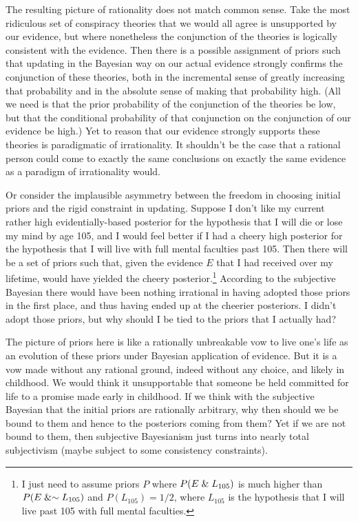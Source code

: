 The resulting picture of rationality does not match common sense. Take the most
ridiculous set of conspiracy theories that we would all agree is unsupported by our evidence, 
but where nonetheless the conjunction of the theories is logically consistent with the evidence.
Then there is a possible assignment of priors such that updating in the Bayesian way on our actual 
evidence strongly confirms the conjunction of these theories, both in the incremental sense of 
greatly increasing that probability and in the absolute sense of making that probability high. (All 
we need is that the prior probability of the conjunction of the theories be low, but that the conditional
probability of that conjunction on the conjunction of our evidence be high.) Yet to reason that
our evidence strongly supports these theories is paradigmatic of irrationality. It shouldn't be the
case that a rational person could come to exactly the same conclusions on exactly the same evidence
as a paradigm of irrationality would.

Or consider the implausible asymmetry between the freedom in choosing initial priors and the
rigid constraint in updating. Suppose I don't like my current rather high evidentially-based posterior for 
the hypothesis that I will die or lose my mind by age 105, and I would feel better if I had a cheery high posterior for 
the hypothesis that I will live with full mental faculties past 105.  Then there will be a set of priors 
such that, given the evidence $E$ that I had received over my lifetime, would have yielded the cheery 
posterior.\footnote{I just need to assume priors $P$ where $P(E\mathrel{\&} L_{105})$ is much higher than 
$P(E\mathrel{\&} \sim L_{105})$ and $P(L_{105})=1/2$, where $L_{105}$ is the hypothesis that I will live past 105 with full mental faculties.} According to 
the subjective Bayesian there would have been nothing irrational in having adopted those priors in 
the first place, and thus having ended up at the cheerier posteriors. I didn't adopt those priors, 
but why should I be tied to the priors that I actually had? 

The picture of priors here is like a rationally unbreakable vow to live one's life as an evolution
of these priors under Bayesian application of evidence. But it is a vow made without any rational 
ground, indeed without any choice, and likely in childhood. We would think it unsupportable that
someone be held committed for life to a promise made early in childhood. If we think with the subjective
Bayesian that the initial priors are rationally arbitrary, why then should we be bound to
them and hence to the posteriors coming from them? Yet if we are not bound to them, then subjective
Bayesianism just turns into nearly total subjectivism (maybe subject to some consistency constraints).

